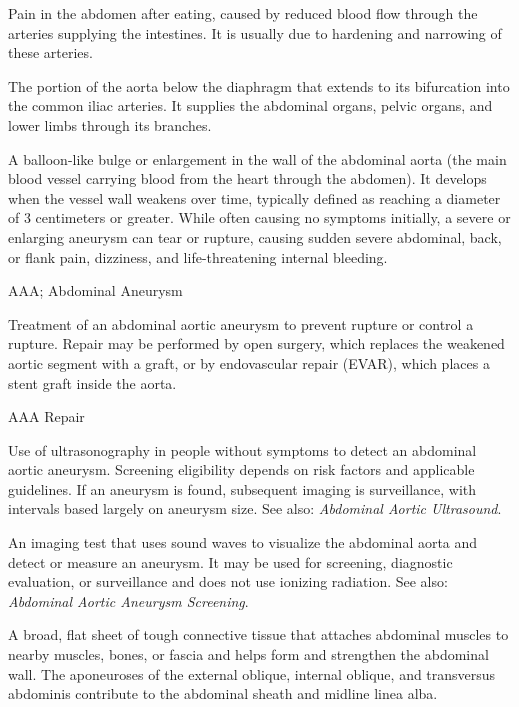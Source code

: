  Pain in the abdomen after eating, caused by reduced blood flow through the arteries supplying the intestines. It is usually due to hardening and narrowing of these arteries.

 The portion of the aorta below the diaphragm that extends to its bifurcation into the common iliac arteries. It supplies
the abdominal organs, pelvic organs, and lower limbs through its branches.

 A balloon-like bulge or enlargement in the wall of the abdominal aorta (the main blood vessel carrying blood from the heart through the abdomen). It develops when the vessel wall weakens over time, typically defined as reaching a diameter of 3 centimeters or greater. While often causing no symptoms initially, a severe or enlarging aneurysm can tear or rupture, causing sudden severe abdominal, back, or flank pain, dizziness, and life-threatening internal bleeding.

\synonyms
AAA; Abdominal Aneurysm

 Treatment of an abdominal aortic aneurysm to prevent rupture or control a rupture. Repair may be performed by open surgery, which replaces the weakened aortic segment with a graft, or by endovascular repair (EVAR), which places a stent graft inside the aorta.

\synonyms
AAA Repair

 Use of ultrasonography in people without symptoms to detect an abdominal aortic aneurysm. Screening eligibility depends on risk factors and applicable guidelines. If an aneurysm is found, subsequent imaging is surveillance, with intervals based largely on aneurysm size. See also: \textit{Abdominal Aortic Ultrasound}.

 An imaging test that uses sound waves to visualize the abdominal aorta and detect or measure an aneurysm. It may be used for screening, diagnostic evaluation, or surveillance and does not use ionizing radiation. See also: \textit{Abdominal Aortic Aneurysm Screening}.

 A broad, flat sheet of tough connective tissue that attaches abdominal muscles to nearby muscles, bones, or fascia and helps form and strengthen the abdominal wall. The aponeuroses of the external oblique, internal oblique, and transversus abdominis contribute to the abdominal sheath and midline linea alba.

